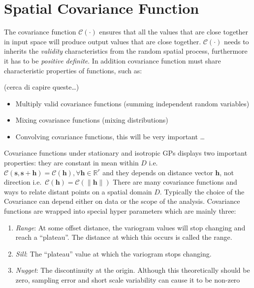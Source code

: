 \documentclass[
  12pt,
  a4paper,
  oneside]{book}
\providecommand{\tightlist}{%
  \setlength{\itemsep}{0pt}\setlength{\parskip}{0pt}}
\begin{document}
\hypertarget{spatial-covariance-function}{%
\section{Spatial Covariance Function}\label{spatial-covariance-function}}

The covariance function \(\mathcal{C}(\cdot)\) ensures that all the values that are close together in input space will produce output values that are close together. \(\mathcal{C}(\cdot)\) needs to inherits the \emph{validity} characteristics from the random spatial process, furthermore it has to be \emph{positive definite}.
In addition covariance function must share characteristic properties of functions, such as:

(cerca di capire queste\ldots)

\begin{itemize}
\tightlist
\item
  Multiply valid covariance functions (summing independent random variables)
\item
  Mixing covariance functions (mixing distributions)
\item
  Convolving covariance functions, this will be very important \ldots{}
\end{itemize}

Covariance functions under stationary and isotropic GPs displays two important properties: they are constant in mean within \(D\) i.e.~\(\mathcal{C}(\mathbf{s}, \mathbf{s}+\mathbf{h})=\mathcal{C}(\mathbf{h}), \forall \mathbf{h} \in \mathbb{R}^{r}\) and they depends on distance vector \(\mathbf{h}\), not direction i.e.~\(\mathcal{C}(\mathbf{h})=\mathcal{C}(\|\mathbf{h}\|)\)
There are many covariance functions and ways to relate distant points on a spatial domain \(D\). Typically the choice of the Covariance can depend either on data or the scope of the analysis. Covariance functions are wrapped into special hyper parameters which are mainly three:

\begin{enumerate}
\def\labelenumi{\arabic{enumi}.}
\tightlist
\item
  \emph{Range}: At some offset distance, the variogram values will stop changing and reach a ``plateau''. The distance at which this occurs is called the range.
\item
  \emph{Sill}: The ``plateau'' value at which the variogram stops changing.
\item
  \emph{Nugget}: The discontinuity at the origin. Although this theoretically should be zero, sampling error and short scale variability can cause it to be non-zero
\end{enumerate}
\end{document}
